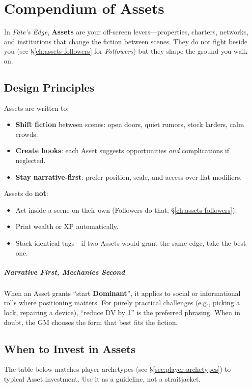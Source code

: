 \chapter{Compendium of Assets}
\label{ch:compendium-assets}

In \textit{Fate's Edge}, \textbf{Assets} are your off-screen levers---properties, charters, networks, and institutions that change the fiction between scenes. They do not fight beside you (see \S\ref{ch:assets-followers} for \emph{Followers}) but they shape the ground you walk on.

\section{Design Principles}
Assets are written to:
\begin{itemize}
  \item \textbf{Shift fiction} between scenes: open doors, quiet rumors, stock larders, calm crowds.
  \item \textbf{Create hooks}: each Asset suggests opportunities \emph{and} complications if neglected.
  \item \textbf{Stay narrative-first}: prefer position, scale, and access over flat modifiers.
\end{itemize}

Assets do \textbf{not}:
\begin{itemize}
  \item Act inside a scene on their own (Followers do that, \S\ref{ch:assets-followers}). 
  \item Print wealth or XP automatically.
  \item Stack identical tags---if two Assets would grant the same edge, take the best one. 
\end{itemize}

\paragraph{Narrative First, Mechanics Second}
When an Asset grants ``start \textbf{Dominant}'', it applies to social or informational rolls where positioning matters. For purely practical challenges (e.g., picking a lock, repairing a device), ``reduce DV by 1'' is the preferred phrasing. When in doubt, the GM chooses the form that best fits the fiction.

\section{When to Invest in Assets}
The table below matches player archetypes (see \S\ref{sec:player-archetypes}) to typical Asset investment. Use it as a guideline, not a straitjacket.

